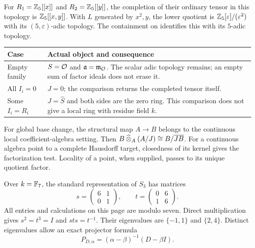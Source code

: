 For $R_1=\mathbb Z_5[[x]]$ and $R_2=\mathbb Z_5[[y]]$, the completion of their ordinary tensor in this topology is $\mathbb Z_5[[x,y]]$. With $L$ generated by $x^2,y$, the lower quotient is $\mathbb Z_5[\varepsilon]/(\varepsilon^2)$ with its $(5,\varepsilon)$-adic topology. The containment on  identifies this with its $5$-adic topology.

\begin{center}\small
\begin{tabularx}{\linewidth}{@{}p{.22\linewidth}Y@{}}\toprule
Case & Actual object and consequence\\\midrule
Empty family & $S=\mathcal O$ and $\mathfrak a=\mathfrak m_\mathcal O$. The scalar adic topology remains; an empty sum of factor ideals does not erase it.\\
All $I_i=0$ & $J=0$; the comparison returns the completed tensor itself.\\
Some $I_i=R_i$ & $J=\widehat S$ and both sides are the zero ring. This comparison does not give a local ring with residue field $k$.\\\bottomrule
\end{tabularx}
\end{center}

For global base change, the structural map $A\to B$ belongs to the continuous local coefficient-algebra setting. Then $B\mathbin{\widehat\otimes}_A(A/J)\cong B/\overline{JB}$. For a continuous algebra point to a complete Hausdorff target, closedness of its kernel gives the factorization test. Locality of a point, when supplied, passes to its unique quotient factor.


Over $k=\mathbb F_7$, the standard representation of $S_3$ has matrices
\[
 s=\begin{pmatrix}6&1\\0&1\end{pmatrix},\qquad
 t=\begin{pmatrix}0&6\\1&6\end{pmatrix}.
\]
All entries and calculations on this page are modulo seven. Direct multiplication gives $s^2=t^3=I$ and $sts=t^{-1}$. Their eigenvalues are $\{-1,1\}$ and $\{2,4\}$. Distinct eigenvalues allow an exact projector formula
\[
P_{D,\alpha}=(\alpha-\beta)^{-1}(D-\beta I).
\]

